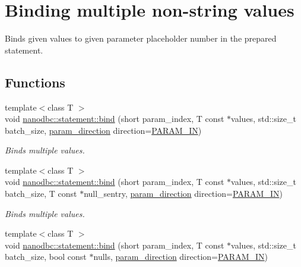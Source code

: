 \hypertarget{group__bind__multi}{}\section{Binding multiple non-\/string values}
\label{group__bind__multi}


Binds given values to given parameter placeholder number in the prepared statement.  


\subsection*{Functions}
\begin{DoxyCompactItemize}
\item 
{\footnotesize template$<$class T $>$ }\\void \mbox{\hyperlink{group__bind__multi_ga21de5d66a3e381040ca03a4f0fdcc5db}{nanodbc\+::statement\+::bind}} (short param\+\_\+index, T const $\ast$values, std\+::size\+\_\+t batch\+\_\+size, \mbox{\hyperlink{classnanodbc_1_1statement_a523142f53cbbee8d68a074da993e7fa6}{param\+\_\+direction}} direction=\mbox{\hyperlink{classnanodbc_1_1statement_a523142f53cbbee8d68a074da993e7fa6ae33f42ce0677d00c291ff4d8e39f99de}{P\+A\+R\+A\+M\+\_\+\+IN}})
\begin{DoxyCompactList}\small\item\em Binds multiple values. \end{DoxyCompactList}\item 
{\footnotesize template$<$class T $>$ }\\void \mbox{\hyperlink{group__bind__multi_gadc594c1e061661b7f95639fcf25ec2cb}{nanodbc\+::statement\+::bind}} (short param\+\_\+index, T const $\ast$values, std\+::size\+\_\+t batch\+\_\+size, T const $\ast$null\+\_\+sentry, \mbox{\hyperlink{classnanodbc_1_1statement_a523142f53cbbee8d68a074da993e7fa6}{param\+\_\+direction}} direction=\mbox{\hyperlink{classnanodbc_1_1statement_a523142f53cbbee8d68a074da993e7fa6ae33f42ce0677d00c291ff4d8e39f99de}{P\+A\+R\+A\+M\+\_\+\+IN}})
\begin{DoxyCompactList}\small\item\em Binds multiple values. \end{DoxyCompactList}\item 
{\footnotesize template$<$class T $>$ }\\void \mbox{\hyperlink{group__bind__multi_gab7047fdb7cfec9bed6861b9a9c9b98cb}{nanodbc\+::statement\+::bind}} (short param\+\_\+index, T const $\ast$values, std\+::size\+\_\+t batch\+\_\+size, bool const $\ast$nulls, \mbox{\hyperlink{classnanodbc_1_1statement_a523142f53cbbee8d68a074da993e7fa6}{param\+\_\+direction}} direction=\mbox{\hyperlink{classnanodbc_1_1statement_a523142f53cbbee8d68a074da993e7fa6ae33f42ce0677d00c291ff4d8e39f99de}{P\+A\+R\+A\+M\+\_\+\+IN}})

\end{DoxyCompactItemize}
